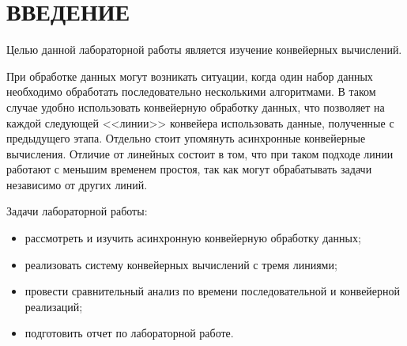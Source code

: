 \section*{ВВЕДЕНИЕ}

Целью данной лабораторной работы является изучение конвейерных вычислений.

При обработке данных могут возникать ситуации, когда один набор данных необходимо обработать последовательно несколькими алгоритмами. В таком случае удобно использовать конвейерную обработку данных, что позволяет на каждой следующей <<линии>> конвейера использовать данные, полученные с предыдущего этапа.
Отдельно стоит упомянуть асинхронные конвейерные вычисления. Отличие от линейных состоит в том, что при таком подходе линии работают с меньшим временем простоя, так как могут обрабатывать задачи независимо от других линий.

Задачи лабораторной работы:
\begin{itemize}[label*=---]
	\item рассмотреть и изучить асинхронную конвейерную обработку данных;
	\item реализовать систему конвейерных вычислений с тремя линиями;
	\item провести сравнительный анализ по времени последовательной и конвейерной реализаций;
	\item подготовить отчет по лабораторной работе.
\end{itemize}
